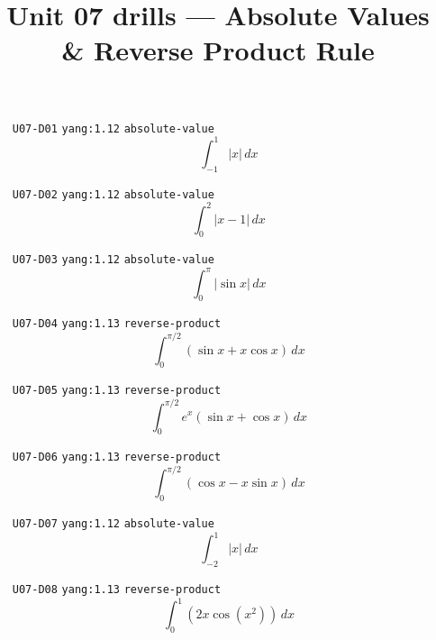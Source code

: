 
\title{Unit 07 drills --- Absolute Values \& Reverse Product Rule}

\maketitle
\begin{enumerate}
\item[\texttt{U07-D01}] \texttt{yang:1.12} \texttt{absolute-value}
\[ \int_{-1}^{1}|x|\,dx \]
\item[\texttt{U07-D02}] \texttt{yang:1.12} \texttt{absolute-value}
\[ \int_0^2 |x-1|\,dx \]
\item[\texttt{U07-D03}] \texttt{yang:1.12} \texttt{absolute-value}
\[ \int_0^{\pi}|\sin x|\,dx \]
\item[\texttt{U07-D04}] \texttt{yang:1.13} \texttt{reverse-product}
\[ \int_0^{\pi/2}(\sin x+x\cos x)\,dx \]
\item[\texttt{U07-D05}] \texttt{yang:1.13} \texttt{reverse-product}
\[ \int_0^{\pi/2} e^x(\sin x+\cos x)\,dx \]
\item[\texttt{U07-D06}] \texttt{yang:1.13} \texttt{reverse-product}
\[ \int_0^{\pi/2}(\cos x-x\sin x)\,dx \]
\item[\texttt{U07-D07}] \texttt{yang:1.12} \texttt{absolute-value}
\[ \int_{-2}^{1}|x|\,dx \]
\item[\texttt{U07-D08}] \texttt{yang:1.13} \texttt{reverse-product}
\[ \int_0^{1}(2x\cos(x^2))\,dx \]
\end{enumerate}

